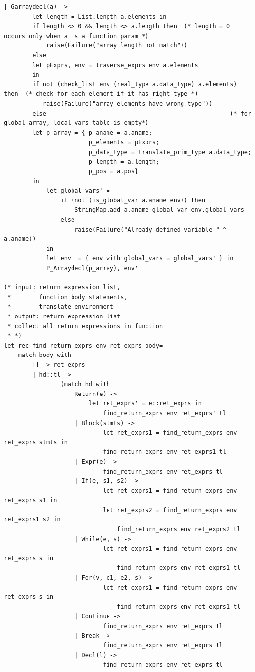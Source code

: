 \documentclass[12pt]{article} %
\begin{document}
\begin{lstlisting}[style=appendix, caption=translate.ml]
    | Garraydecl(a) -> 
        let length = List.length a.elements in
        if length <> 0 && length <> a.length then  (* length = 0 occurs only when a is a function param *)
            raise(Failure("array length not match"))
        else
        let pExprs, env = traverse_exprs env a.elements 
        in
        if not (check_list env (real_type a.data_type) a.elements) then  (* check for each element if it has right type *)
           raise(Failure("array elements have wrong type"))
        else                                                    (* for global array, local_vars table is empty*)
        let p_array = { p_aname = a.aname; 
                        p_elements = pExprs;
                        p_data_type = translate_prim_type a.data_type; 
                        p_length = a.length;
                        p_pos = a.pos} 
        in
            let global_vars' = 
                if (not (is_global_var a.aname env)) then
                    StringMap.add a.aname global_var env.global_vars
                else
                    raise(Failure("Already defined variable " ^ a.aname))
            in
            let env' = { env with global_vars = global_vars' } in
            P_Arraydecl(p_array), env'

(* input: return expression list, 
 *        function body statements,
 *        translate environment
 * output: return expression list
 * collect all return expressions in function
 * *)
let rec find_return_exprs env ret_exprs body= 
    match body with
        [] -> ret_exprs
        | hd::tl ->
                (match hd with 
                    Return(e) -> 
                        let ret_exprs' = e::ret_exprs in
                            find_return_exprs env ret_exprs' tl
                    | Block(stmts) -> 
                            let ret_exprs1 = find_return_exprs env ret_exprs stmts in
                            find_return_exprs env ret_exprs1 tl
                    | Expr(e) -> 
                            find_return_exprs env ret_exprs tl
                    | If(e, s1, s2) ->
                            let ret_exprs1 = find_return_exprs env ret_exprs s1 in
                            let ret_exprs2 = find_return_exprs env ret_exprs1 s2 in
                                find_return_exprs env ret_exprs2 tl
                    | While(e, s) ->
                            let ret_exprs1 = find_return_exprs env ret_exprs s in
                                find_return_exprs env ret_exprs1 tl
                    | For(v, e1, e2, s) ->
                            let ret_exprs1 = find_return_exprs env ret_exprs s in
                                find_return_exprs env ret_exprs1 tl
                    | Continue -> 
                            find_return_exprs env ret_exprs tl
                    | Break ->
                            find_return_exprs env ret_exprs tl
                    | Decl(l) ->
                            find_return_exprs env ret_exprs tl  
                     

\end{lstlisting}
\end{document}

